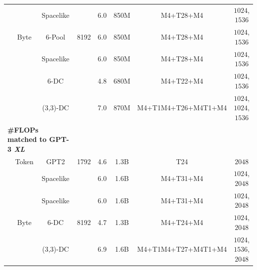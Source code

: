 \documentclass{article}
\newcommand{\model}{H-Net}
\newcommand{\twostage}{2-stage}
\newcommand{\onestage}{1-stage}
\theoremstyle{plain}
\theoremstyle{remark}
\begin{document}
\begin{table}[t!]
{\begin{tabular}{lccccccc}
\cellcolor{Cyan7!10}{SpaceByte++} & & Spacelike & & 6.0 & 850M & \colorbox{EncDec0}{M4}+\colorbox{Main}{T28}+\colorbox{EncDec0}{M4} & \colorbox{EncDec0}{$1024$}, \colorbox{Main}{$1536$}\\
\cellcolor{Green7!10}{H-Net (pool)} & \multirow{-2}{*}{Byte} & 6-Pool & \multirow{-2}{*}{8192} & 6.0 & 850M & \colorbox{EncDec0}{M4}+\colorbox{Main}{T28}+\colorbox{EncDec0}{M4} & \colorbox{EncDec0}{$1024$}, \colorbox{Main}{$1536$}\\
\cellcolor{Green7!10}{H-Net (space)} & & Spacelike & & 6.0 & 850M & \colorbox{EncDec0}{M4}+\colorbox{Main}{T28}+\colorbox{EncDec0}{M4} & \colorbox{EncDec0}{$1024$}, \colorbox{Main}{$1536$}\\
\cellcolor{Orange7!10}{\model{} (\onestage{})} & & 6-DC & & 4.8 & 680M & \colorbox{EncDec0}{M4}+\colorbox{Main}{T22}+\colorbox{EncDec0}{M4} & \colorbox{EncDec0}{$1024$}, \colorbox{Main}{$1536$}\\
\cellcolor{Red7!10}{\model{} (\twostage{})} & & (3,3)-DC & & 7.0 & 870M & \colorbox{EncDec0}{M4}+\colorbox{EncDec1}{T1M4}+\colorbox{Main}{T26}+\colorbox{EncDec1}{M4T1}+\colorbox{EncDec0}{M4} & \colorbox{EncDec0}{$1024$}, \colorbox{EncDec1}{$1024$}, \colorbox{Main}{$1536$}\\
\midrule
\multicolumn{3}{l}{\quad \textbf{\#FLOPs matched to GPT-3 \textit{XL}}}\\
\cellcolor{Gray7!20}{Transformer} & {Token} & {GPT2} & {1792} & 4.6 & 1.3B & \colorbox{Main}{T24} & \colorbox{Main}{$2048$}\\
\addlinespace[-0.15em]
\cmidrule{1-8}
\addlinespace[-0.25em]
\cellcolor{Cyan7!10}{SpaceByte++} & & Spacelike & & 6.0 & 1.6B & \colorbox{EncDec0}{M4}+\colorbox{Main}{T31}+\colorbox{EncDec0}{M4} & \colorbox{EncDec0}{$1024$}, \colorbox{Main}{$2048$}\\
\cellcolor{Green7!10}{H-Net (space)} & & Spacelike & & 6.0 & 1.6B & \colorbox{EncDec0}{M4}+\colorbox{Main}{T31}+\colorbox{EncDec0}{M4} & \colorbox{EncDec0}{$1024$}, \colorbox{Main}{$2048$}\\
\cellcolor{Orange7!10}{\model{} (\onestage{})} & \multirow{-2}{*}{Byte} & 6-DC & \multirow{-2}{*}{8192} & 4.7 & 1.3B & \colorbox{EncDec0}{M4}+\colorbox{Main}{T24}+\colorbox{EncDec0}{M4} & \colorbox{EncDec0}{$1024$}, \colorbox{Main}{$2048$}\\
\cellcolor{Red7!10}{\model{} (\twostage{})} & & (3,3)-DC & & 6.9 & 1.6B & \colorbox{EncDec0}{M4}+\colorbox{EncDec1}{T1M4}+\colorbox{Main}{T27}+\colorbox{EncDec1}{M4T1}+\colorbox{EncDec0}{M4} & \colorbox{EncDec0}{$1024$}, \colorbox{EncDec1}{$1536$}, \colorbox{Main}{$2048$}\\
\bottomrule
\end{tabular}
} 
\label{tab: architecture}
\end{table}
\end{document}
